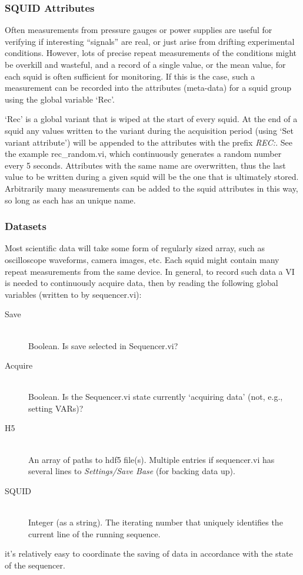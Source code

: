 \documentclass[10pt,a4paper]{article}
\begin{document}
\subsubsection{SQUID Attributes}
Often measurements from pressure gauges or power supplies are useful for verifying if interesting ``signals'' are real, or just arise from drifting experimental conditions.  However, lots of precise repeat measurements of the conditions might be overkill and wasteful, and a record of a single value, or the mean value, for each squid is often sufficient for monitoring.  If this is the case, such a measurement can be recorded into the attributes (meta-data) for a squid group using the global variable `Rec'.

`Rec' is a global variant that is wiped at the start of every squid.  At the end of a squid any values written to the variant during the acquisition period (using `Set variant attribute') will be appended to the attributes with the prefix \emph{REC:}.  See the example rec\_random.vi, which continuously generates a random number every 5 seconds.  Attributes with the same name are overwritten, thus the last value to be written during a given squid will be the one that is ultimately stored. Arbitrarily  many measurements can be added to the squid attributes in this way, so long as each has an unique name.

\subsubsection{Datasets}
Most scientific data will take some form of regularly sized array, such as oscilloscope waveforms, camera images, etc.  Each squid might contain many repeat measurements from the same device. In general, to record such data a VI is needed to continuously acquire data, then by reading the following global variables (written to by sequencer.vi):
\begin{description}
	\item[Save] \hfill \\
	Boolean. Is save selected in Sequencer.vi?
	\item[Acquire] \hfill \\
	Boolean. Is the Sequencer.vi state currently `acquiring data' (not, e.g., setting VARs)?
	\item[H5] \hfill \\	
	An array of paths to hdf5 file(s).   Multiple entries if sequencer.vi has several lines to \emph{Settings/Save Base} (for backing data up).
	\item[SQUID] \hfill \\
	Integer (as a string). The iterating number that uniquely identifies the current line of the running sequence.

\end{description}
it's relatively easy to coordinate the saving of data in accordance with the state of the sequencer.
\end{document}
